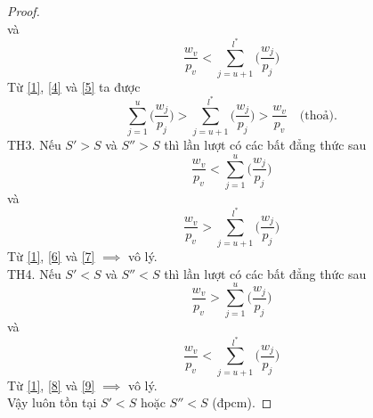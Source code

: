 \documentclass[12pt,a4paper]{report}
\begin{document}
\begin{proof}
\begin{equation}
	\end{equation}
	và
	\begin{equation} \label{5}
		\frac{w_v}{p_v} < \sum_{j=u+1}^{l^*}\biggl(\frac{w_j}{p_j}\biggr)
	\end{equation}
	Từ \eqref{1}, \eqref{4} và \eqref{5} ta được
	\begin{equation}
		 \sum_{j=1}^{u}\biggl(\frac{w_j}{p_j}\biggl) > \sum_{j=u+1}^{l^*}\biggl(\frac{w_j}{p_j}\biggl) > \frac{w_v}{p_v} \quad \text{(thoả).}
	\end{equation}
	TH3.
	Nếu $S' > S$ và $S'' > S$ thì lần lượt có các bất đẳng thức sau
	\begin{equation} \label{6}
		\frac{w_v}{p_v} < \sum_{j=1}^{u}\biggl(\frac{w_j}{p_j}\biggr)
	\end{equation}
	và
	\begin{equation} \label{7}
		\frac{w_v}{p_v} > \sum_{j=u+1}^{l^*}\biggl(\frac{w_j}{p_j}\biggr)
	\end{equation}
	Từ \eqref{1}, \eqref{6} và \eqref{7} $\implies$ vô lý. \\
	TH4.
	Nếu $S' < S$ và $S'' < S$ thì lần lượt có các bất đẳng thức sau
	\begin{equation} \label{8}
		\frac{w_v}{p_v} > \sum_{j=1}^{u}\biggl(\frac{w_j}{p_j}\biggr)
	\end{equation}
	và
	\begin{equation} \label{9}
		\frac{w_v}{p_v} < \sum_{j=u+1}^{l^*}\biggl(\frac{w_j}{p_j}\biggr)
	\end{equation}
	Từ \eqref{1}, \eqref{8} và \eqref{9} $\implies$ vô lý. \\
	Vậy luôn tồn tại $S'<S$ hoặc $S''<S$ (đpcm).
\end{proof}
\end{document}
